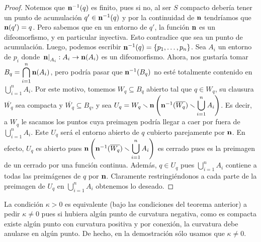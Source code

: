 \begin{teo}[Hadamard]
\begin{proof}
Notemos que $\operatorname{\mathbf{n}}^{-1}(q)$ es finito, pues si no, al ser $S$ compacto debería tener un punto de acumulación $q'\in\operatorname{\mathbf{n}}^{-1}(q)$ y por la continuidad de $\operatorname{\mathbf{n}}$ tendríamos que $\operatorname{\mathbf{n}}(q')=q$. Pero sabemos que en un entorno de $q'$, la función $\operatorname{\mathbf{n}}$ es un difeomorfismo, y en particular inyectiva. Esto contradice que sea un punto de acumulación. Luego, podemos escribir $\operatorname{\mathbf{n}}^{-1}(q)=\{p_1,\ldots , p_n\}$. Sea $A_i$ un entorno de $p_i$ donde $\left.\operatorname{\mathbf{n}}\right|_{A_i}:A_i\to\operatorname{\mathbf{n}}(A_i)$ es un difeomorfismo. Ahora, nos gustaría tomar $B_q = \displaystyle\bigcap_{i=1}^n \operatorname{\mathbf{n}}(A_i)$, pero podría pasar que $\operatorname{\mathbf{n}}^{-1}(B_q)$ no esté totalmente contenido en $\displaystyle\bigcup_{i=1}^n A_i$. Por este motivo, tomemos $W_q\subseteq B_q$ abierto tal que $q\in W_q$, su clausura $\overline{W_q}$ sea compacta y $\overline{W_q}\subseteq B_q$, y sea $U_q=W_q\smallsetminus \operatorname{\mathbf{n}}\left(\operatorname{\mathbf{n}}^{-1}(\overline{W_q})\smallsetminus\displaystyle\bigcup_{i=1}^n A_i\right)$. Es decir, a $W_q$ le sacamos los puntos cuya preimagen podría llegar a caer por fuera de $\displaystyle\bigcup_{i=1}^n A_i$. Este $U_q$ será el entorno abierto de $q$ cubierto parejamente por $\operatorname{\mathbf{n}}$. En efecto, $U_q$ es abierto pues $\operatorname{\mathbf{n}}\left(\operatorname{\mathbf{n}}^{-1}(\overline{W_q})\smallsetminus\displaystyle\bigcup_{i=1}^n A_i\right)$ es cerrado pues es la preimagen de un cerrado por una función continua. Además, $q\in U_q$ pues $\displaystyle\bigcup_{i=1}^n A_i$ contiene a todas las preimágenes de $q$ por $\operatorname{\mathbf{n}}$. Claramente restringiéndonos a cada parte de la preimagen de $U_q$ en $\displaystyle\bigcup_{i=1}^n A_i$ obtenemos lo deseado.
\end{proof}
\end{teo}

\begin{obs}
La condición $\kappa>0$ es equivalente (bajo las condiciones del teorema anterior) a pedir $\kappa\neq 0$ pues si hubiera algún punto de curvatura negativa, como es compacta existe algún punto con curvatura positiva y por conexión, la curvatura debe anularse en algún punto. De hecho, en la demostración sólo usamos que $\kappa\neq 0$.
\end{obs}